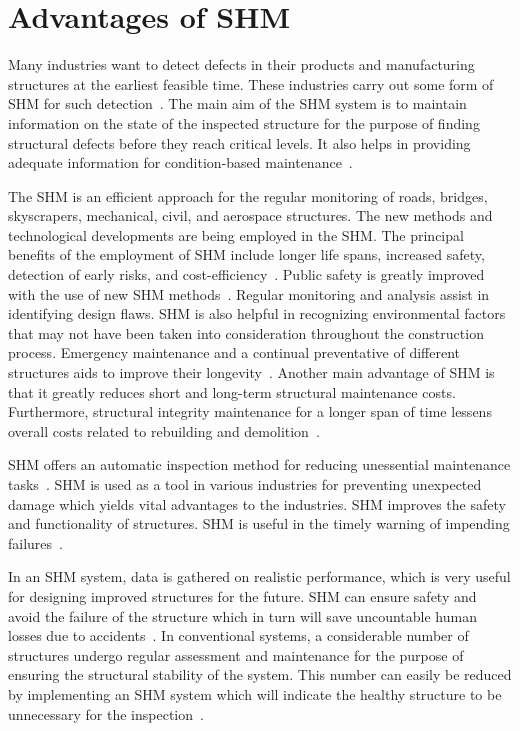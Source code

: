 \documentclass[b5paper, 11pt, titlepage]{book}
\begin{document}
\section{Advantages of SHM}
Many industries want to detect defects in their products and manufacturing structures at the earliest feasible time. These industries carry out some form of SHM for such detection~\cite{Farrar2007, Farrar2012}. The main aim of the SHM system is to maintain information on the state of the inspected structure for the purpose of finding structural defects before they reach critical levels. It also helps in providing adequate information for condition-based maintenance~\cite{Farrar2007}.

The SHM is an efficient approach for the regular monitoring of roads, bridges, skyscrapers, mechanical, civil, and aerospace structures. The new methods and technological developments are being employed in the SHM. The principal benefits of the employment of SHM include longer life spans, increased safety, detection of early risks, and cost-efficiency~\cite{Farrar2012, Crane2017}. Public safety is greatly improved with the use of new SHM methods~\cite{jawaid2018structural}. Regular monitoring and analysis assist in identifying design flaws. SHM is also helpful in recognizing environmental factors that may not have been taken into consideration throughout the construction process. Emergency maintenance and a continual preventative of different structures aids to improve their longevity~\cite{jawaid2018structural}. Another main advantage of SHM is that it greatly reduces short and long-term structural maintenance costs. Furthermore, structural integrity maintenance for a longer span of time lessens overall costs related to rebuilding and demolition~\cite{Lamonaca2018}. 

SHM offers an automatic inspection method for reducing unessential maintenance tasks~\cite{Guemes2020a}. SHM is used as a tool in various industries for preventing unexpected damage which yields vital advantages to the industries. SHM improves the safety and functionality of structures. SHM is useful in the timely warning of impending failures~\cite{TibaduizaBurgos2020, jawaid2018structural}.

In an SHM system, data is gathered on realistic performance, which is very useful for designing improved structures for the future. SHM can ensure safety and avoid the failure of the structure which in turn will save uncountable human losses due to accidents~\cite{jawaid2018structural}. In conventional systems, a considerable number of structures undergo regular assessment and maintenance for the purpose of ensuring the structural stability of the system. This number can easily be reduced by implementing an SHM system which will indicate the healthy structure to be unnecessary for the inspection~\cite{jawaid2018structural}.
\end{document}
